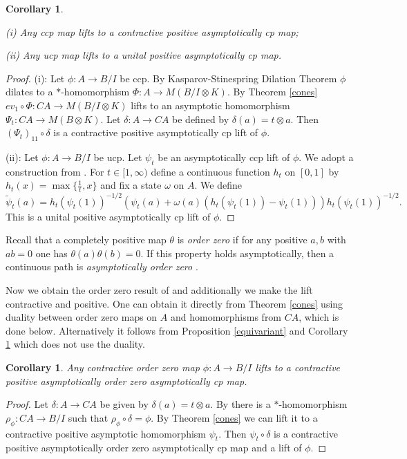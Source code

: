 \documentclass{article}%
\newtheorem{corollary}[theorem]{Corollary}
\begin{document}
\begin{corollary}\label{ShortProof}

(i) Any  ccp map lifts to a  contractive positive asymptotically cp map;

(ii)  Any ucp map lifts to a unital positive asymptotically cp map.

\end{corollary}
\begin{proof} (i):   Let $\phi: A \to B/I$ be ccp.   By Kasparov-Stinespring Dilation Theorem \cite{KasparovDilation} $\phi$ dilates to a $\ast$-homomorphism $\Phi: A \to M(B/I \otimes K)$. By Theorem \ref{cones}   $ev_1\circ \Phi: CA \to M(B/I\otimes K)$ lifts to an asymptotic homomorphism $\Psi_t: CA \to M(B\otimes K)$. Let $\delta: A \to CA$ be defined by $\delta(a) = t\otimes a$. Then $(\Psi_t)_{11}\circ \delta$ is a contractive positive asymptotically cp lift of $\phi$.


(ii): Let  $\phi: A \to B/I$ be ucp. Let $\psi_t$  be an asymptotically ccp lift of $\phi$. We adopt a construction from \cite[Lemma 13.1.2]{BO}.  For $t\in [1, \infty)$ define a continuous function $h_t$ on $[0, 1]$  by
$h_t(x) = \max\{\frac{1}{t}, x\}$ and fix a state $\omega$ on $A$. We define
$$\tilde\psi_t(a) = h_t(\psi_t(1))^{-1/2}\left( \psi_t(a) +\omega(a) (h_t(\psi_t(1)) - \psi_t(1))\right) h_t(\psi_t(1))^{-1/2}.$$ This is a unital
positive asymptotically cp lift of $\phi$.
\end{proof}


Recall that a completely positive map $\theta$ is {\it order zero} if for any positive $a, b$ with $ab=0$ one has $\theta(a)\theta(b)=0$. If this property holds asymptotically, then a continuous path is {\it asymptotically order zero}  \cite{FGT}.

 Now we obtain the order zero result of \cite{FGT} and additionally we make the lift contractive and positive.
 One can obtain it directly from Theorem \ref{cones} using duality between order zero maps on $A$ and homomorphisms from $CA$, which is done below. Alternatively it follows from Proposition \ref{equivariant} and Corollary \ref{ShortProof} which does not use the duality.




\begin{corollary}\label{corollaryOrderZero} Any contractive order zero map $\phi: A \to B/I$ lifts to a contractive positive asymptotically order zero  asymptotically cp map. \end{corollary}
\begin{proof} Let $\delta: A \to CA$ be given by $\delta(a) = t\otimes a$. By \cite{WZ} there is a $\ast$-homomorphism $\rho_{\phi}: CA \to B/I$ such that $\rho_{\phi}\circ\delta  = \phi$. By Theorem \ref{cones} we can lift it to a contractive  positive asymptotic homomorphism $\psi_t$.  Then $\psi_t\circ \delta$ is a contractive positive asymptotically order zero asymptotically cp map and a lift of $\phi$.
\end{proof}
\end{document}
